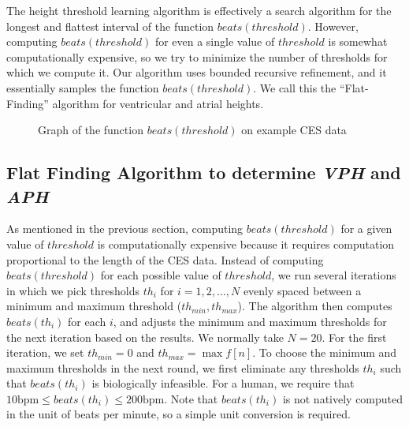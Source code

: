 \documentclass[conference]{IEEEtran}
\newcommand{\APH}{\textit{APH}}
\newcommand{\VPH}{\textit{VPH}}
\begin{document}
The height threshold learning algorithm is effectively a search algorithm for the longest and flattest
interval of the function $beats(threshold)$.
However, computing $beats(threshold)$ for even a single value of $threshold$ 
is somewhat computationally expensive,
so we try to minimize the number of thresholds for which we compute it.
Our algorithm uses bounded recursive refinement, and it essentially samples the function $beats(threshold)$.
We call this the ``Flat-Finding'' algorithm for
ventricular and atrial heights.


\begin{figure}
	\centering
	\caption{Graph of the function $beats(threshold)$ on example CES data}
	\label{fig:beats}
\end{figure}

\subsection{Flat Finding Algorithm to determine \VPH{} and \APH{}}
As mentioned in the previous section, computing $beats(threshold)$ for a given value of $threshold$
is computationally expensive because it requires computation proportional to the length of the CES data.
Instead of computing $beats(threshold)$ for each possible value of $threshold$, we run several iterations in which
we pick thresholds $th_i$ for $i = 1, 2, \dots, N$ evenly spaced
between a minimum and maximum threshold ($th_{min}, th_{max}$).  The algorithm then computes
$beats(th_i)$ for each $i$, and adjusts the minimum and
maximum thresholds for the next iteration based on the
results.
We normally take $N=20$.
For the first iteration, we set
$th_{min} = 0$ and $th_{max} = \max f[n]$. 
To choose the minimum and maximum thresholds in
the next round, we first eliminate any thresholds $th_i$
such that $beats(th_i)$ is biologically infeasible. %
For a human, we require that $10 \text{bpm} \le beats(th_i) \le 200 \text{bpm}$.
Note that $beats(th_i)$ is not natively computed in the unit of beats per minute, so a simple unit conversion is required.
\end{document}

